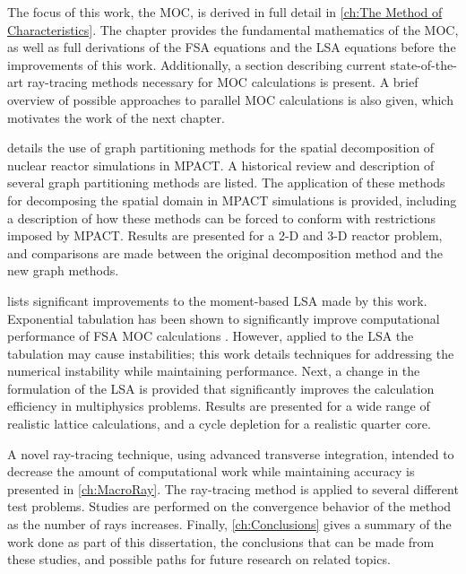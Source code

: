 {{    The focus of this work, the \ac{MOC}, is derived in full detail in \cref{ch:The Method of Characteristics}.
    The chapter provides the fundamental mathematics of the \ac{MOC}, as well as full derivations of the \acf{FSA} equations and the \acf{LSA} equations before the improvements of this work.
    Additionally, a section describing current state-of-the-art ray-tracing methods necessary for \ac{MOC} calculations is present.
    A brief overview of possible approaches to parallel \ac{MOC} calculations is also given, which motivates the work of the next chapter.

     details the use of graph partitioning methods for the spatial decomposition of nuclear reactor simulations in MPACT.
    A historical review and description of several graph partitioning methods are listed.
    The application of these methods for decomposing the spatial domain in MPACT simulations is provided, including a description of how these methods can be forced to conform with restrictions imposed by MPACT.
    Results are presented for a 2-D and 3-D reactor problem, and comparisons are made between the original decomposition method and the new graph methods.

     lists significant improvements to the moment-based \acf{LSA} made by this work.
    Exponential tabulation has been shown to significantly improve computational performance of \ac{FSA} \ac{MOC} calculations \cite{Yamamoto2004}.
    However, applied to the \ac{LSA} the tabulation may cause instabilities; this work details techniques for addressing the numerical instability while maintaining performance.
    Next, a change in the formulation of the \ac{LSA} is provided that significantly improves the calculation efficiency in multiphysics problems.
    Results are presented for a wide range of realistic lattice calculations, and a cycle depletion for a realistic quarter core.

    A novel ray-tracing technique, using advanced transverse integration, intended to decrease the amount of computational work while maintaining accuracy is presented in \cref{ch:MacroRay}.
    The ray-tracing method is applied to several different test problems.
    Studies are performed on the convergence behavior of the method as the number of rays increases.
    Finally, \cref{ch:Conclusions} gives a summary of the work done as part of this dissertation, the conclusions that can be made from these studies, and possible paths for future research on related topics.
  }
  \printbibliography
}